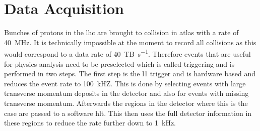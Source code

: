 \section{Data Acquisition}
Bunches of protons in the \ac{lhc} are brought to collision in \ac{atlas} with a rate of \qty[]{40}{MHz}. It is technically impossible at the moment to record all collisions as this would correspond to a data rate of \qty[]{40}{TB\per s}. Therefore events that are useful for physics analysis need to be preselected which is called triggering and is performed in two steps. The first step is the \ac{l1} trigger and is hardware based and reduces the event rate to \qty[]{100}{kHZ}. This is done by selecting events with large transverse momentum deposits in the detector and also for events with missing transverse momentum. Afterwards the regions in the detector where this is the case are passed to a software \ac{hlt}. This then uses the full detector information in these regions to reduce the rate further down to \qty[]{1}{kHz}.
